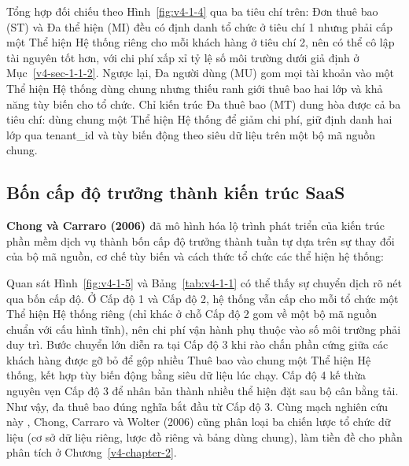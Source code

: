 
Tổng hợp đối chiếu theo Hình~\ref{fig:v4-1-4} qua ba tiêu chí trên: Đơn thuê bao (ST) và Đa thể hiện (MI) đều có định danh tổ chức ở tiêu chí 1 nhưng phải cấp một Thể hiện Hệ thống riêng cho mỗi khách hàng ở tiêu chí 2, nên có thể cô lập tài nguyên tốt hơn, với chi phí xấp xỉ tỷ lệ số môi trường dưới giả định ở Mục~\ref{v4-sec-1-1-2}. Ngược lại, Đa người dùng (MU) gom mọi tài khoản vào một Thể hiện Hệ thống dùng chung nhưng thiếu ranh giới thuê bao hai lớp và khả năng tùy biến cho tổ chức. Chỉ kiến trúc Đa thuê bao (MT) dung hòa được cả ba tiêu chí: dùng chung một Thể hiện Hệ thống để giảm chi phí, giữ định danh hai lớp qua tenant\_\allowbreak{}id và tùy biến động theo siêu dữ liệu trên một bộ mã nguồn chung.

\subsection{Bốn cấp độ trưởng thành kiến trúc SaaS}\label{v4-sec-1-3-2}

\textbf{Chong và Carraro (2006) \cite{v4-15}} đã mô hình hóa lộ trình phát triển của kiến trúc phần mềm dịch vụ thành bốn cấp độ trưởng thành tuần tự dựa trên sự thay đổi của bộ mã nguồn, cơ chế tùy biến và cách thức tổ chức các thể hiện hệ thống:


Quan sát Hình~\ref{fig:v4-1-5} và Bảng~\ref{tab:v4-1-1} có thể thấy sự chuyển dịch rõ nét qua bốn cấp độ. Ở Cấp độ 1 và Cấp độ 2, hệ thống vẫn cấp cho mỗi tổ chức một Thể hiện Hệ thống riêng (chỉ khác ở chỗ Cấp độ 2 gom về một bộ mã nguồn chuẩn với cấu hình tĩnh), nên chi phí vận hành phụ thuộc vào số môi trường phải duy trì. Bước chuyển lớn diễn ra tại Cấp độ 3 khi rào chắn phần cứng giữa các khách hàng được gỡ bỏ để gộp nhiều Thuê bao vào chung một Thể hiện Hệ thống, kết hợp tùy biến động bằng siêu dữ liệu lúc chạy. Cấp độ 4 kế thừa nguyên vẹn Cấp độ 3 để nhân bản thành nhiều thể hiện đặt sau bộ cân bằng tải. Như vậy, đa thuê bao đúng nghĩa bắt đầu từ Cấp độ 3. Cùng mạch nghiên cứu này \cite{v4-15}, Chong, Carraro và Wolter (2006) \cite{v4-16} cũng phân loại ba chiến lược tổ chức dữ liệu (cơ sở dữ liệu riêng, lược đồ riêng và bảng dùng chung), làm tiền đề cho phần phân tích ở Chương~\ref{v4-chapter-2}.

